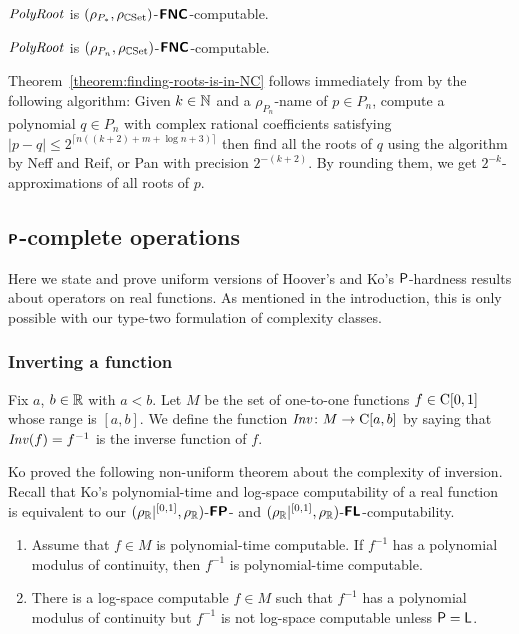 \documentclass[envcountsame,orivec,oribibl]{llncs}
\begin{document}
\begin{theorem}
 \label{theorem:finding-roots-is-in-NC}
 $\mathit{PolyRoot}$ is $(\rho_{P_*}, \rho_{\mathbb C\mathrm{Set}})$-$\text{\bfseries \sffamily \upshape FNC}$-computable.
\end{theorem}

\begin{corollary}
 $\mathit{PolyRoot}$ is $(\rho_{P_n}, \rho_{\mathbb C\mathrm{Set}})$-$\text{\bfseries \sffamily \upshape FNC}$-computable.
\end{corollary}


Theorem~\ref{theorem:finding-roots-is-in-NC} follows immediately from
by the following algorithm:
Given $k \in \mathbb N$ and a $\rho_{P_n}$-name of $p \in P_n$, 
compute a polynomial $q \in {P_n}$ with complex rational coefficients
satisfying $|p - q| \le 2^{\lceil n((k+2) + m + \log n + 3)\rceil}$
then find all the roots of $q$ using the algorithm by Neff and Reif, or Pan
with precision $2^{-(k+2)}$.
By rounding them, we get $2^{-k}$-approximations of all roots of $p$.

\subsection{$\text{\bfseries \sffamily \upshape P}$-complete operations}
\label{section:P-complete}

Here we state and prove uniform versions of 
Hoover's and Ko's $\mathsf{P}$-hardness results 
about operators on real functions. 
As mentioned in the introduction, 
this is only possible with our type-two formulation of complexity classes. 

\subsubsection{Inverting a function}

Fix $a$, $b \in \mathbb R$ with $a < b$. 
Let $M$ be the set of one-to-one functions $f \in \mathrm C[0,1]$
whose range is $[a,b]$.
We define the function $\mathit{Inv} \colon M \to \mathrm C [a, b]$ 
by saying that $\mathit{Inv} (f) = f ^{-1}$ is the inverse function of $f$. 

Ko proved the following non-uniform theorem about the complexity of inversion.
Recall that Ko's polynomial-time and log-space computability of a real function
is equivalent to our $(\rho _\mathbb R|^{[0,1]}, \rho _\mathbb R)$-$\text{\bfseries \sffamily \upshape FP}$- and $(\rho _\mathbb R|^{[0,1]}, \rho _\mathbb R)$-$\text{\bfseries \sffamily \upshape FL}$-computability. 

\begin{theorem}
\label{theorem: ko inversion}
\begin{enumerate}
\item \label{enumi:ko1991-4.7}
Assume that $f \in M$ is polynomial-time computable. 
If $f^{-1}$ has a polynomial modulus of continuity, 
then $f^{-1}$ is polynomial-time computable.
\item \label{enumi:ko1991-4.18}
There is a log-space computable $f \in M$
such that $f^{-1}$ has a polynomial modulus of continuity
but $f^{-1}$ is not log-space computable
unless $\mathsf{P} = \mathsf{L}$.
\end{enumerate}
\end{theorem}
\end{document}
